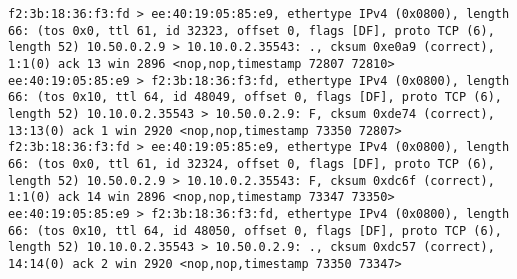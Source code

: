 \documentclass[a4paper,12pt]{article}
\begin{document}
\begin{Verbatim}
f2:3b:18:36:f3:fd > ee:40:19:05:85:e9, ethertype IPv4 (0x0800), length 66: (tos 0x0, ttl 61, id 32323, offset 0, flags [DF], proto TCP (6), length 52) 10.50.0.2.9 > 10.10.0.2.35543: ., cksum 0xe0a9 (correct), 1:1(0) ack 13 win 2896 <nop,nop,timestamp 72807 72810>
ee:40:19:05:85:e9 > f2:3b:18:36:f3:fd, ethertype IPv4 (0x0800), length 66: (tos 0x10, ttl 64, id 48049, offset 0, flags [DF], proto TCP (6), length 52) 10.10.0.2.35543 > 10.50.0.2.9: F, cksum 0xde74 (correct), 13:13(0) ack 1 win 2920 <nop,nop,timestamp 73350 72807>
f2:3b:18:36:f3:fd > ee:40:19:05:85:e9, ethertype IPv4 (0x0800), length 66: (tos 0x0, ttl 61, id 32324, offset 0, flags [DF], proto TCP (6), length 52) 10.50.0.2.9 > 10.10.0.2.35543: F, cksum 0xdc6f (correct), 1:1(0) ack 14 win 2896 <nop,nop,timestamp 73347 73350>
ee:40:19:05:85:e9 > f2:3b:18:36:f3:fd, ethertype IPv4 (0x0800), length 66: (tos 0x10, ttl 64, id 48050, offset 0, flags [DF], proto TCP (6), length 52) 10.10.0.2.35543 > 10.50.0.2.9: ., cksum 0xdc57 (correct), 14:14(0) ack 2 win 2920 <nop,nop,timestamp 73350 73347>


\end{Verbatim}
\end{document}
